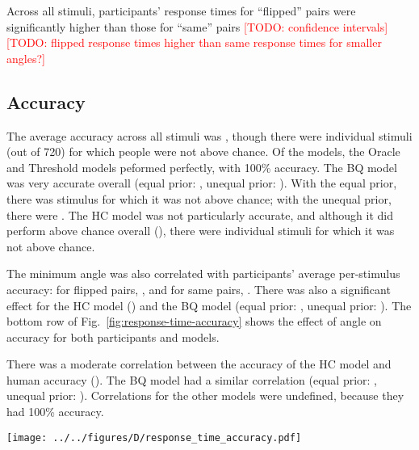 \documentclass[10pt,letterpaper]{article}
\newcommand{\TODO}[1]{\textcolor{red}{[TODO: #1]}}
\newcommand{\Oc}[0]{Oracle}
\newcommand{\Th}[0]{Threshold}
\newcommand{\Hc}[0]{HC}
\newcommand{\Bq}[0]{BQ}
\begin{document}
Across all stimuli, participants' response times for ``flipped'' pairs
were significantly higher than those for ``same'' pairs
\TODO{confidence intervals} \TODO{flipped response times higher than
  same response times for smaller angles?}

\subsection{Accuracy}

The average accuracy across all stimuli was \ExpAccuracy{}, though
there were \ExpNumChance{} individual stimuli (out of 720) for which
people were not above chance. Of the models, the \Oc{} and \Th{}
models peformed perfectly, with 100\% accuracy. The \Bq{} model was
very accurate overall (equal prior: \BqAccuracy{}, unequal prior:
\BqpAccuracy{}). With the equal prior, there was \BqNumChance{}
stimulus for which it was not above chance; with the unequal prior,
there were \BqpNumChance{}. The \Hc{} model was not particularly
accurate, and although it did perform above chance overall
(\HcAccuracy{}), there were \HcNumChance{} individual stimuli for
which it was not above chance.

The minimum angle was also correlated with participants' average
per-stimulus accuracy: for flipped pairs,
\ExpThetaAccuracyCorrFlipped{}, and for same pairs,
\ExpThetaAccuracyCorrSame{}. There was also a significant effect for
the \Hc{} model (\HcThetaAccuracyCorr{}) and the \Bq{} model (equal
prior: \BqThetaAccuracyCorr{}, unequal prior:
\BqpThetaAccuracyCorr{}). The bottom row of
Fig.~\ref{fig:response-time-accuracy} shows the effect of angle on
accuracy for both participants and models.

There was a moderate correlation between the accuracy of the \Hc{}
model and human accuracy (\ExpHcAccuracyCorr{}). The \Bq{} model had a
similar correlation (equal prior: \ExpBqAccuracyCorr{}, unequal prior:
\ExpBqpAccuracyCorr{}). Correlations for the other models were
undefined, because they had 100\% accuracy.


\begin{figure*}[t]
  \begin{center}
    \texttt{[image: ../../figures/D/response\_time\_accuracy.pdf]}
    \caption{\textbf{Response time and accuracy comparison.} Top:
      response time of correct responses as a function of the minimum
      angle of rotation. Bottom: accuracy as a function of the minumum
      angle of rotation. All error bars are 95\% confidence
      intervals.}
    \label{fig:response-time-accuracy}
  \end{center}
\end{figure*}
\end{document}
